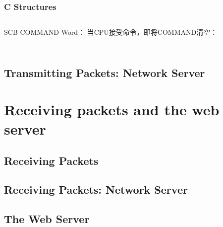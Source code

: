 \documentclass{article}
\begin{document}
\begin{CJK*}{UTF8}{gkai}
\begin{lstlisting}[style=ccode, firstnumber=36, title={\scriptsize \ttfamily \bfseries kern/pci.c}]
\end{lstlisting}


\subsubsection{C Structures}

\begin{lstlisting}[style=exercise]
\end{lstlisting}




SCB COMMAND Word： 当CPU接受命令，即将COMMAND清空：

\begin{lstlisting}[style=ccode, firstnumber=36, title={\scriptsize \ttfamily \bfseries kern/pci.c}]
\end{lstlisting}


\begin{lstlisting}[style=ccode, firstnumber=36, title={\scriptsize \ttfamily \bfseries kern/pci.c}]
\end{lstlisting}



\subsection{Transmitting Packets: Network Server}


\section{Receiving packets and the web server}

\subsection{Receiving Packets}

\subsection{Receiving Packets: Network Server}

\subsection{The Web Server}

\begin{lstlisting}[style=ccode, title={\scriptsize \ttfamily \bfseries : ()}]
\end{lstlisting}

\begin{lstlisting}[style=ccode, title={\scriptsize \ttfamily \bfseries : ()}]
\end{lstlisting}

\begin{lstlisting}[style=ccode, title={\scriptsize \ttfamily \bfseries : ()}]
\end{lstlisting}

\begin{lstlisting}[style=exercise]
\end{lstlisting}

\clearpage

\end{CJK*}
\end{document}
